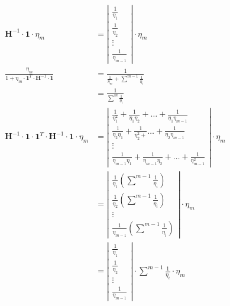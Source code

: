 \documentclass{article}
\begin{document}
\begin{subequations}
    \begin{align}
        \boldsymbol{H}^{-1} \cdot \boldsymbol{1} \cdot \eta_m &= \left| \begin{matrix} \frac{1}{\eta_1} \\ \frac{1}{\eta_2} \\ \vdots \\ \frac{1}{\eta_{m - 1}} \end{matrix}\right| \cdot \eta_m \\
        \frac{\eta_m}{1 + \eta_m \cdot \boldsymbol{1}^{T} \cdot \boldsymbol{H}^{-1} \cdot \boldsymbol{1}} &= \frac{1}{\frac{1}{\eta_m} + \sum^{m - 1}{\frac{1}{\eta_i}}} \nonumber \\
        &= \frac{1}{\sum^{m}{\frac{1}{\eta_i}}} \\
        \boldsymbol{H}^{-1} \cdot \boldsymbol{1} \cdot \boldsymbol{1}^{T} \cdot \boldsymbol{H}^{-1} \cdot \boldsymbol{1} \cdot \eta_m &= \left| \begin{matrix} \frac{1}{\eta_1^2} + \frac{1}{\eta_1 \eta_2} + \dots + \frac{1}{\eta_1 \eta_{m - 1}} \\ \frac{1}{\eta_2 \eta_1} + \frac{1}{\eta_{2}^{2} +} \dots + \frac{1}{\eta_2 \eta_{m - 1}}  \\ \vdots \\ \frac{1}{\eta_{m - 1} \eta_1} + \frac{1}{\eta_{m - 1} \eta_2} + \dots + \frac{1}{\eta_{m - 1}^{2}} \end{matrix} \right| \cdot \eta_m \nonumber \\
        &= \left| \begin{matrix}\frac{1}{\eta_1} \left(\sum^{m - 1}{\frac{1}{\eta_i}}\right) \\ \frac{1}{\eta_2} \left(\sum^{m - 1}{\frac{1}{\eta_i}}\right) \\ \vdots \\ \frac{1}{\eta_{m - 1}} \left(\sum^{m - 1}{\frac{1}{\eta_i}}\right) \end{matrix} \right| \cdot \eta_m \nonumber \\
        &= \left| \begin{matrix} \frac{1}{\eta_1} \\ \frac{1}{\eta_2} \\ \vdots \\ \frac{1}{\eta_{m - 1}} \end{matrix} \right| \cdot \sum^{m - 1}{\frac{1}{\eta_i}} \cdot \eta_m
    \end{align}
\end{subequations}
\end{document}
